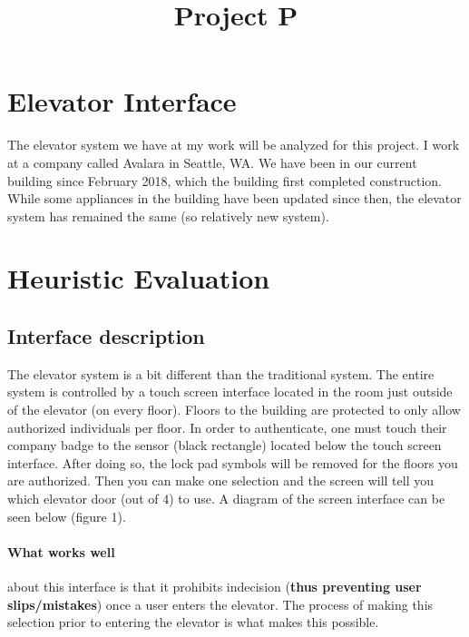 

\title{Project P\\}



\maketitle
\thispagestyle{fancy}

\section{Elevator Interface}
The elevator system we have at my work will be analyzed for this project. I work at a company called Avalara in Seattle, WA. We have been in our current building since February 2018, which the building first completed construction. While some appliances in the building have been updated since then, the elevator system has remained the same (so relatively new system).

\section{Heuristic Evaluation}

\subsection{Interface description}
The elevator system is a bit different than the traditional system. The entire system is controlled by a touch screen interface located in the room just outside of the elevator (on every floor). Floors to the building are protected to only allow authorized individuals per floor. In order to authenticate, one must touch their company badge to the sensor (black rectangle) located below the touch screen interface. After doing so, the lock pad symbols will be removed for the floors you are authorized. Then you can make one selection and the screen will tell you which elevator door (out of 4) to use. A diagram of the screen interface can be seen below (figure 1).

\paragraph{What works well} about this interface is that it prohibits indecision (\textbf{thus preventing user slips/mistakes}) once a user enters the elevator. The process of making this selection prior to entering the elevator is what makes this possible.

